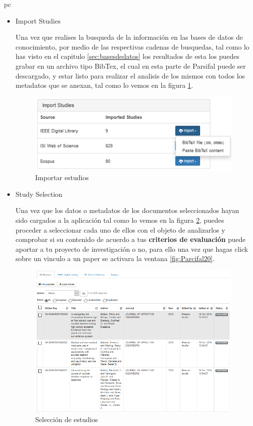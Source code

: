 pc\documentclass[a4paper,12pt,openany]{book}
\begin{document}
\begin{itemize}
\begin{itemize}
\item Import Studies

Una vez que realises la busqueda de la información en las bases de datos de conocimiento, por medio de las respectivas cadenas de busquedas, tal como lo has visto en el capitulo \ref{sec:basesdedatos} los resultados de esta los puedes grabar en un archivo tipo BibTex, el cual en esta parte de Parsifal puede ser descargado, y estar listo para realizar el analisis de los mismos con todos los metadatos que se anexan, tal como lo vemos en la figura \ref{fig:Parcifal18}.

    \begin{figure}[H]
    \centering
	\includegraphics[width=12cm]{parsifal18.png}
    \caption{Importar estudios}
    \label{fig:Parcifal18}
    \end{figure}

\item Study Selection

Una vez que los datos o metadatos de los documentos seleccionados hayan sido cargados a la aplicación tal como lo vemos en la figura \ref{fig:Parcifal19},  puedes proceder a seleccionar cada uno de ellos con el objeto de analizarlos y comprobar si su contenido de acuerdo a tus \textbf{criterios de evaluación} puede aportar a tu proyecto de investigación o no, para ello una vez que hagas click sobre un vinculo a un paper se activara la ventana \ref{fig:Parcifal20}.

    \begin{figure}[H]
    \centering
	\includegraphics[width=12cm]{parsifal19.png}
    \caption{Selección de estudios}
    \label{fig:Parcifal19}
    \end{figure}


\end{itemize}
\end{itemize}
\end{document}
